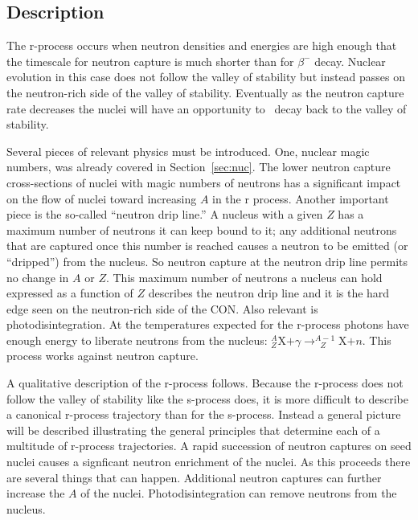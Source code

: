 \label{sec:r}
\subsection{Description}

The r-process occurs when neutron
densities and energies are high enough that the timescale for
neutron capture is much shorter than for $\beta^-$ decay.  Nuclear
evolution in this case does not follow the valley of stability but
instead passes on the neutron-rich side of the valley of stability.
Eventually as the neutron capture rate decreases the nuclei will have
an opportunity to \bminus\ decay back to the valley of stability.

Several pieces of relevant physics must be introduced.  One, nuclear
magic numbers, was already covered in Section~\ref{sec:nuc}.  The
lower neutron capture cross-sections of nuclei with magic numbers of
neutrons has a significant impact on the flow of nuclei toward
increasing $A$ in the r process.  Another important piece 
 is the so-called
``neutron drip line.''  A nucleus with a given $Z$ has a maximum
number of neutrons it can keep bound to it; any additional neutrons
that are captured once this number is reached causes a neutron to be
emitted (or ``dripped'') from the nucleus.  So neutron capture at 
the neutron drip line permits no change in $A$ or $Z$.  
This maximum number of neutrons a nucleus can hold expressed as a
function of $Z$ describes the neutron drip line and it is the hard
edge seen on the neutron-rich side of the CON.  Also relevant is
photodisintegration.  At the temperatures expected for the r-process
photons have enough energy to liberate neutrons from the nucleus:
$^A_Z$X$+\gamma \rightarrow _{\ \ \ Z}^{A-1}$X$+n$.  This process
works against neutron capture.

A qualitative description of the r-process follows.  Because the 
r-process does not follow the valley of stability like the
s-process does, it is more difficult to describe a canonical r-process
trajectory than for the s-process.  Instead a general picture
will be described illustrating the general principles that determine
each of a multitude of r-process trajectories.  A
rapid succession of neutron captures on seed nuclei causes a
signficant neutron enrichment of the nuclei.  As this proceeds there
are several things that can happen.  Additional neutron captures can
further increase the $A$ of the nuclei.  Photodisintegration can
remove neutrons from the nucleus.


